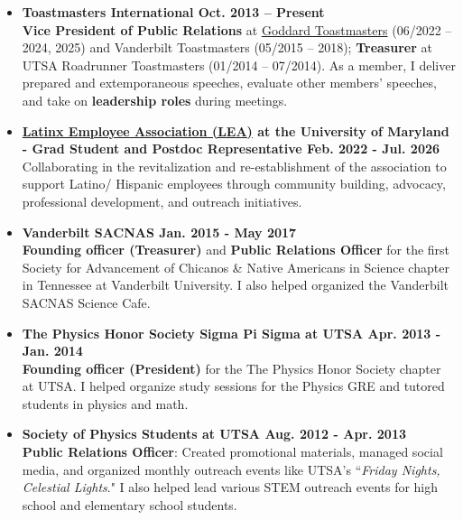 \documentclass[12pt]{article}
\begin{document}
\begin{itemize}
    \item \textbf{Toastmasters International \hfill Oct. 2013 – Present} \\
    \textbf{Vice President of Public Relations} at \href{https://nasa-communities.org/clubs/toastmasters/}{Goddard Toastmasters} (06/2022 – 2024, 2025) and Vanderbilt Toastmasters (05/2015 – 2018); \textbf{Treasurer} at UTSA Roadrunner Toastmasters (01/2014 – 07/2014). As a member, I deliver prepared and extemporaneous speeches, evaluate other members’ speeches, and take on \textbf{leadership roles} during meetings.
    \item \textbf{\href{https://umdlatino.wordpress.com/about/board-members/}{Latinx Employee Association (LEA)} at the University of Maryland - Grad Student and Postdoc Representative \hfill Feb. 2022 - Jul. 2026} \\
    Collaborating in the revitalization and re-establishment of the association to support Latino/ Hispanic employees through community building, advocacy, professional development, and outreach initiatives.
    \item \textbf{Vanderbilt SACNAS \hfill Jan. 2015 - May 2017} \\
    \textbf{Founding officer (Treasurer)} and \textbf{Public Relations Officer} for the first Society for Advancement of Chicanos \& Native Americans in Science chapter in Tennessee at Vanderbilt University. I also helped organized the Vanderbilt SACNAS Science Cafe.
    \item \textbf{The Physics Honor Society \text{\textbar} Sigma Pi Sigma at UTSA \hfill Apr. 2013 - Jan. 2014} \\
    \textbf{Founding officer (President)} for the The Physics Honor Society chapter at UTSA. I helped organize study sessions for the Physics GRE and tutored students in physics and math.
    \item \textbf{Society of Physics Students at UTSA \hfill Aug. 2012 - Apr. 2013} \\
    \textbf{Public Relations Officer}: Created promotional materials, managed social media, and organized monthly outreach events like UTSA’s “\textit{Friday Nights, Celestial Lights}." I also helped lead various STEM outreach events for high school and elementary school students.
\end{itemize}
\end{document}
